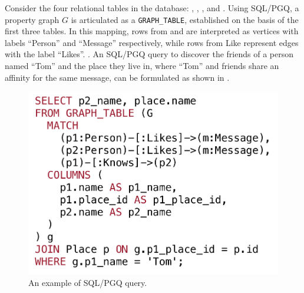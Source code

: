 \begin{example}
    \label{ex:introduction:sqlpgq}
    Consider the four relational tables in the database: , , , and . Using SQL/PGQ, a property graph $G$ is articulated as a \lstinline{GRAPH_TABLE}, established on the basis of the first three tables. In this mapping, rows from  and  are interpreted as vertices with labels ``Person'' and ``Message'' respectively, while rows from Like represent edges with the label ``Likes''. . An SQL/PGQ query to discover the friends of a person named ``Tom'' and the place they live in, where ``Tom'' and friends share an affinity for the same message, can be formulated as shown in .
    \begin{figure}
        \centering
        \includegraphics[width=.7\linewidth]{./figures/intro-query.pdf}
        \vspace*{-1mm}
        \caption{An example of SQL/PGQ query.}
        \label{fig:intro-query}
        \vspace*{-1mm}
    \end{figure}
\end{example}

